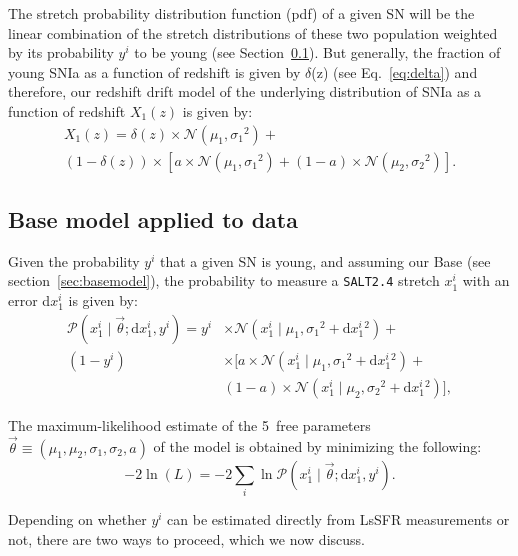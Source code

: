 \documentclass[]{aa} %
\newcommand{\mr}[1]{{\textcolor[rgb]{0.60,0.10,0.6}{#1}}}
\newcommand{\prob}[2]{\mathcal{P}\left( #1 \mid #2\right)}
\begin{document}
\mr{The stretch probability distribution function (pdf) of a given SN will be the linear combination of the stretch distributions of these two population weighted by its probability $y^i$ to be young (see Section~\ref{sec:basemodelapplied}). But generally, the fraction of young SNIa as a function of redshift is given by $\delta$(z) (see Eq.~\ref{eq:delta}) and therefore, our redshift drift model of the underlying distribution of SNIa as a function of redshift $X_1(z)$ is given by}:
\begin{multline}\label{eq:stretchz}
    X_1(z) = \delta(z) \times \mathcal{N}(\mu_1,\sigma_1{}^2) + {} \\
    (1-\delta(z)) \times \left[ a\times\mathcal{N}(\mu_1,\sigma_1{}^2) +
    (1-a)\times\mathcal{N}(\mu_2,\sigma_2{}^2) \right].
\end{multline}



\subsection{Base model applied to data}
\label{sec:basemodelapplied}

Given the probability $y^i$ that a given SN is young, and assuming our Base (see section~\ref{sec:basemodel}), the probability to measure a \textsc{\texttt{SALT2.4}} stretch $x_1^i$ with an error d$x_1^i$ is given by:
\begin{align}\label{eq:likelihoodsnf}
    \prob{x^i_1}{\vec{\theta}; \mathrm{d}x^i_1, y^i} =
    y^i & \times
    \mathcal{N}\left(x^i_1 \mid \mu_1, \sigma_1{}^2+\mathrm{d}x^i_1{}^2\right) +
    \nonumber\\
    (1-y^i) &\times \bigg[
    a \times \mathcal{N}\left(x^i_1 \mid \mu_1,
    \sigma_1{}^2+\mathrm{d}x^i_1{}^2\right) +
    \nonumber\\
    & (1-a) \times \mathcal{N}\left(x^i_1 \mid \mu_2,
    \sigma_2{}^{2}+\mathrm{d}x^i_1{}^2\right) \bigg],
\end{align}

The maximum-likelihood estimate of the 5~free parameters
$\vec{\theta}\equiv({\mu_1,\mu_2,\sigma_1,\sigma_2,a})$ of the model is obtained
by minimizing the following:
\begin{equation}\label{eq:likelihood}
    -2\ln(L) = -2 \sum_i \ln \prob{x^{i}_{1}}{\vec{\theta};
    \mathrm{d}x^{i}_{1}, y^i}.
\end{equation}

Depending on whether $y^i$ can be estimated directly from LsSFR measurements or not, there are two ways to proceed, which we now discuss.
\end{document}
